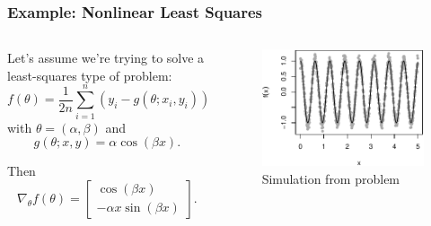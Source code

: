 \documentclass[aspectratio=1610,onlytextwidth]{beamer}
\begin{document}
\begin{frame}[c]
  \frametitle{Example: Nonlinear Least Squares}

  \begin{columns}
    \begin{column}{0.42\textwidth}
      Let's assume we're trying to solve a least-squares type of problem:
      $$f(\theta) = \frac{1}{2n} \sum_{i=1}^n  \left(y_i - g(\theta; x_i, y_i)\right)^2$$
      with $\theta = (\alpha, \beta)$ and
      $$g(\theta; x, y) = \alpha \cos(\beta x).$$

      \bigskip\pause

      Then
      \[
        \nabla_{\theta} f(\theta) =
        \begin{bmatrix}
          \cos(\beta x) \\ - \alpha x \sin(\beta x)
        \end{bmatrix}.
      \]
    \end{column}
    \begin{column}{0.5\textwidth}
      \begin{figure}[htpb]
        \centering
        \includegraphics[]{images/nonlinear-data.pdf}
        \caption{%
          Simulation from problem
        }
      \end{figure}
    \end{column}
  \end{columns}
\end{frame}
\end{document}
